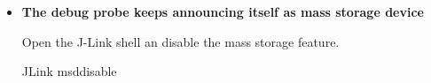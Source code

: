\begin{itemize}
  \item {\bf The debug probe keeps announcing itself as mass storage device}

    Open the J-Link shell an disable the mass storage feature.
  \begin{monobox}
JLink
msddisable
\end{monobox}
\end{itemize}
